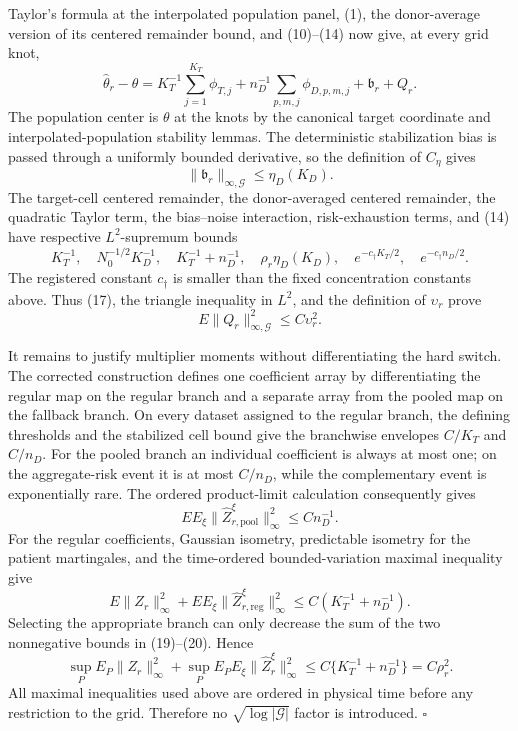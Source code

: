 Taylor's formula at the interpolated population panel, (1), the donor-average
version of its centered remainder bound, and (10)--(14) now give, at every
grid knot,
\[
 \widehat\theta_r-\theta
 =K_T^{-1}\sum_{j=1}^{K_T}\phi_{T,j}
 +n_D^{-1}\sum_{p,m,j}\phi_{D,p,m,j}
 +\mathfrak b_r+Q_r.                                    \tag{15}
\]
The population center is \(\theta\) at the knots by the canonical target
coordinate and interpolated-population stability lemmas.  The deterministic
stabilization bias is passed through a uniformly bounded derivative, so the
definition of \(C_\eta\) gives
\[
 \|\mathfrak b_r\|_{\infty,\mathcal G}\le\eta_D(K_D). \tag{16}
\]
The target-cell centered remainder, the donor-averaged centered remainder,
the quadratic Taylor term, the bias--noise interaction, risk-exhaustion
terms, and (14) have respective \(L^2\)-supremum bounds
\[
 K_T^{-1},\quad N_0^{-1/2}K_D^{-1},\quad
 K_T^{-1}+n_D^{-1},\quad \rho_r\eta_D(K_D),\quad
 e^{-c_\dagger K_T/2},\quad e^{-c_\dagger n_D/2}.       \tag{17}
\]
The registered constant \(c_\dagger\) is smaller than the fixed concentration
constants above.  Thus (17), the triangle inequality in \(L^2\), and the
definition of \(\upsilon_r\) prove
\[
 E\|Q_r\|_{\infty,\mathcal G}^2\le C\upsilon_r^2.      \tag{18}
\]

It remains to justify multiplier moments without differentiating the hard
switch.  The corrected construction defines one coefficient array by
differentiating the regular map on the regular branch and a separate array
from the pooled map on the fallback branch.  On every dataset assigned to the
regular branch, the defining thresholds and the stabilized cell bound give
the branchwise envelopes \(C/K_T\) and \(C/n_D\).  For the pooled branch an
individual coefficient is always at most one; on the aggregate-risk event it
is at most \(C/n_D\), while the complementary event is exponentially rare.
The ordered product-limit calculation consequently gives
\[
 E E_\xi\|\widehat Z_{r,\mathrm{pool}}^\xi\|_\infty^2
 \le Cn_D^{-1}.                                        \tag{19}
\]
For the regular coefficients, Gaussian isometry, predictable isometry for the
patient martingales, and the time-ordered bounded-variation maximal inequality
give
\[
 E\|Z_r\|_\infty^2+E E_\xi
 \|\widehat Z_{r,\mathrm{reg}}^\xi\|_\infty^2
 \le C(K_T^{-1}+n_D^{-1}).                              \tag{20}
\]
Selecting the appropriate branch can only decrease the sum of the two
nonnegative bounds in (19)--(20).  Hence
\[
 \sup_PE_P\|Z_r\|_\infty^2+
 \sup_PE_PE_\xi\|\widehat Z_r^\xi\|_\infty^2
 \le C\{K_T^{-1}+n_D^{-1}\}=C\rho_r^2.                \tag{21}
\]
All maximal inequalities used above are ordered in physical time before any
restriction to the grid.  Therefore no \(\sqrt{\log|\mathcal G|}\) factor is
introduced. \(\square\)
